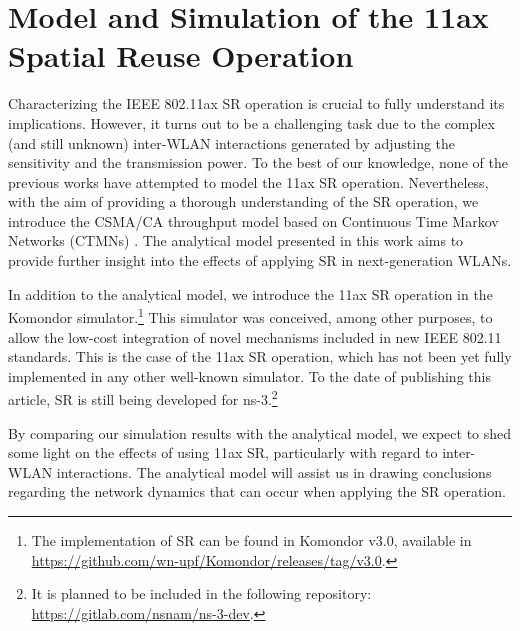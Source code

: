 \documentclass[comsoc]{IEEEtran}
\begin{document}
	
	\section{Model and Simulation of the 11ax Spatial Reuse Operation}
	\label{section:analytical_model}
	
	Characterizing the IEEE 802.11ax SR operation is crucial to fully understand its implications. However, it turns out to be a challenging task due to the complex (and still unknown) inter-WLAN interactions generated by adjusting the sensitivity and the transmission power. To the best of our knowledge, none of the previous works have attempted to model the 11ax SR operation. Nevertheless, with the aim of providing a thorough understanding of the SR operation, we introduce the CSMA/CA throughput model based on Continuous Time Markov Networks (CTMNs) \cite{bellalta2014throughput, bellalta2017throughput}. The analytical model presented in this work aims to provide further insight into the effects of applying SR in next-generation WLANs.
	
	In addition to the analytical model, we introduce the 11ax SR operation in the Komondor \cite{barrachina2019komondor} simulator.\footnote{The implementation of SR can be found in Komondor v3.0, available in \url{https://github.com/wn-upf/Komondor/releases/tag/v3.0}.} This simulator was conceived, among other purposes, to allow the low-cost integration of novel mechanisms included in new IEEE 802.11 standards. This is the case of the 11ax SR operation, which has not been yet fully implemented in any other well-known simulator. To the date of publishing this article, SR is still being developed for ns-3.\footnote{It is planned to be included in the following repository: \url{https://gitlab.com/nsnam/ns-3-dev}.} 
	
	By comparing our simulation results with the analytical model, we expect to shed some light on the effects of using 11ax SR, particularly with regard to inter-WLAN interactions. The analytical model will assist us in drawing conclusions regarding the network dynamics that can occur when applying the SR operation.
	
\end{document}
